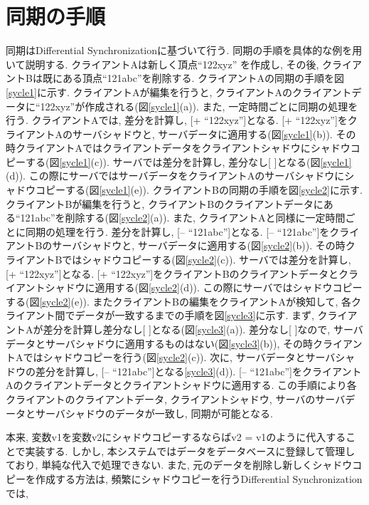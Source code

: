 \section{同期の手順}
同期はDifferential Synchronizationに基づいて行う.
同期の手順を具体的な例を用いて説明する. クライアントAは新しく頂点``122xyz''
を作成し, その後, クライアントBは既にある頂点``121abc''を削除する.
クライアントAの同期の手順を図\ref{sycle1}に示す.
クライアントAが編集を行うと, クライアントAのクライアントデータに``122xyz''が作成される(図\ref{sycle1}(a)).
また, 一定時間ごとに同期の処理を行う. クライアントAでは, 差分を計算し, [+ ``122xyz'']となる. [+ ``122xyz'']をクライアントAのサーバシャドウと, サーバデータに適用する(図\ref{sycle1}(b)). その時クライアントAではクライアントデータをクライアントシャドウにシャドウコピーする(図\ref{sycle1}(c)). サーバでは差分を計算し, 差分なし[ ]となる(図\ref{sycle1}(d)). この際にサーバではサーバデータをクライアントAのサーバシャドウにシャドウコピーする(図\ref{sycle1}(e)).
クライアントBの同期の手順を図\ref{sycle2}に示す.
クライアントBが編集を行うと, クライアントBのクライアントデータにある``121abc''を削除する(図\ref{sycle2}(a)).
また, クライアントAと同様に一定時間ごとに同期の処理を行う. 差分を計算し, [-- ``121abc'']となる. [-- ``121abc'']をクライアントBのサーバシャドウと, サーバデータに適用する(図\ref{sycle2}(b)). その時クライアントBではシャドウコピーする(図\ref{sycle2}(c)). サーバでは差分を計算し, [+ ``122xyz'']となる. [+ ``122xyz'']をクライアントBのクライアントデータとクライアントシャドウに適用する(図\ref{sycle2}(d)). この際にサーバではシャドウコピーする(図\ref{sycle2}(e)).
またクライアントBの編集をクライアントAが検知して, 各クライアント間でデータが一致するまでの手順を図\ref{sycle3}に示す.
まず, クライアントAが差分を計算し差分なし[ ]となる(図\ref{sycle3}(a)).
差分なし[ ]なので, サーバデータとサーバシャドウに適用するものはない(図\ref{sycle3}(b)), その時クライアントAではシャドウコピーを行う(図\ref{sycle2}(c)).
次に, サーバデータとサーバシャドウの差分を計算し,  [-- ``121abc'']となる\ref{sycle3}(d)). [-- ``121abc'']をクライアントAのクライアントデータとクライアントシャドウに適用する.
この手順により各クライアントのクライアントデータ, クライアントシャドウ, サーバのサーバデータとサーバシャドウのデータが一致し, 同期が可能となる.
\par
本来, 変数v1を変数v2にシャドウコピーするならばv2 = v1のように代入することで実装する. しかし, 本システムではデータをデータベースに登録して管理しており, 単純な代入で処理できない.
また, 元のデータを削除し新しくシャドウコピーを作成する方法は, 頻繁にシャドウコピーを行うDifferential Synchronizationでは,

